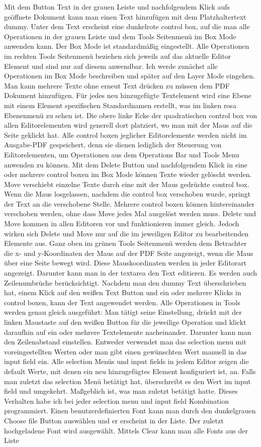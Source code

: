 Mit dem Button Text in der grauen Leiste und nachfolgendem Klick aufs geöffnete Dokument kann man einen Text hinzufügen mit dem Platzhaltertext dummy. Unter dem Text erscheint eine dunkelrote control box, auf die man alle Operationen in der grauen Leiste und dem Tools Seitenmenü im Box Mode anwenden kann. Der Box Mode ist standardmäßig eingestellt. Alle Operationen im rechten Tools Seitenmenü beziehen sich jeweils auf das aktuelle Editor Element und sind nur auf diesem anwendbar. Ich werde zunächst alle Operationen im Box Mode beschreiben und später auf den Layer Mode eingehen. Man kann mehrere Texte ohne erneut Text drücken zu müssen dem PDF Dokument hinzufügen. Für jedes neu hinzugefügte Textelement wird eine Ebene mit einem  Element spezifischen Standardnamen erstellt, was im linken rosa Ebenenmenü zu sehen ist. Die obere linke Ecke der quadratischen control box von allen Editorelementen wird generell dort platziert, wo man mit der Maus auf die Seite geklickt hat. Alle control boxen jeglicher Editorelemente werden nicht im Ausgabe-PDF gespeichert, denn sie dienen lediglich der Steuerung von Editorelementen, um Operationen aus dem Operations Bar und Tools Menu anwenden zu können. Mit dem Delete Button und nachfolgendem Klick in eine oder mehrere control boxen im Box Mode können Texte wieder gelöscht werden. Move verschiebt einzelne Texte durch eine mit der Maus gedrückte control box. Wenn die Maus losgelassen, nachdem die control box verschoben wurde, springt der Text an die verschobene Stelle. Mehrere control boxen können hintereinander verschoben werden, ohne dass Move jedes Mal ausgelöst werden muss. Delete und Move kommen in allen Editoren vor und funktionieren immer gleich. Jedoch wirken sich Delete und Move nur auf die im jeweiligen Editor zu bearbeitenden Elemente aus. Ganz oben im grünen Tools Seitenmenü werden dem Betrachter die x- und y-Koordinaten der Maus auf der PDF Seite angezeigt, wenn die Maus über eine Seite bewegt wird. Diese Mauskoordinaten werden in jeder Editorart angezeigt. Darunter kann man in der textarea den Text editieren. Es werden auch Zeilenumbrüche berücksichtigt. Nachdem man den dummy Text überschrieben hat, einem Klick auf den weißen Text Button und ein oder mehrere Klicks in control boxen, kann der Text angewendet werden. Alle Operationen in Tools werden genau gleich ausgeführt: Man tätigt seine Einstellung, drückt mit der linken Maustaste auf den weißen Button für die jeweilige Operation und klickt daraufhin auf ein oder mehrere Textelemente nacheinander. Darunter kann man den Zeilenabstand einstellen. Entweder verwendet man das selection menu mit voreingestellten Werten oder man gibt einen gewünschten Wert manuell in das input field ein. Alle selection Menüs und input fields in jedem Editor zeigen die default Werte, mit denen ein neu hinzugefügtes Element konfiguriert ist, an. Falls man zuletzt das selection Menü betätigt hat, überschreibt es den Wert im input field und umgekehrt. Maßgeblich ist, was man zuletzt betätigt hatte. Dieses Verhalten habe ich bei jeder selection menu und input field Kombination programmiert. Einen benutzerdefinierten Font kann man durch den dunkelgrauen Choose file Button auswählen und er erscheint in der Liste. Der zuletzt hochgeladene Font wird ausgewählt. Mittels Clear kann man alle Fonts aus der Liste 